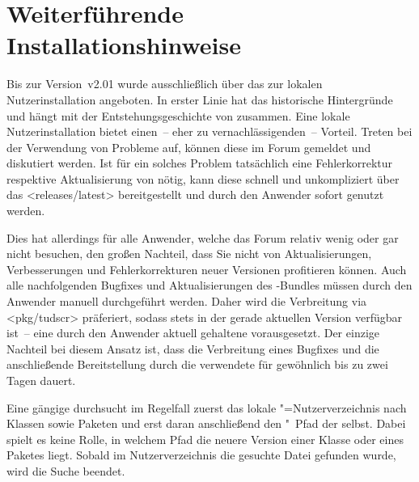\chapter{%
  Weiterführende Installationshinweise%
  \label{sec:install:ext}%
}
\noindent{}

\bigskip\noindent
Bis zur Version~v2.01 wurde \TUDScript ausschließlich über das \Forum zur 
lokalen Nutzerinstallation angeboten. In erster Linie hat das historische 
Hintergründe und hängt mit der Entstehungsgeschichte von \TUDScript zusammen. 
Eine lokale Nutzerinstallation bietet einen~-- eher zu vernachlässigenden~-- 
Vorteil. Treten bei der Verwendung von \TUDScript Probleme auf, können diese im 
Forum gemeldet und diskutiert werden. Ist für ein solches Problem tatsächlich 
eine Fehlerkorrektur respektive Aktualisierung von \TUDScript nötig, kann diese 
schnell und unkompliziert über das \GitHubRepo<releases/latest> bereitgestellt 
und durch den Anwender sofort genutzt werden.

Dies hat allerdings für alle Anwender, welche das Forum relativ wenig oder gar 
nicht besuchen, den großen Nachteil, dass Sie nicht von Aktualisierungen, 
Verbesserungen und Fehlerkorrekturen neuer Versionen profitieren können. Auch 
alle nachfolgenden Bugfixes und Aktualisierungen des \TUDScript-Bundles müssen 
durch den Anwender manuell durchgeführt werden. Daher wird die Verbreitung via 
\CTAN<pkg/tudscr> präferiert, sodass \TUDScript stets in der gerade aktuellen 
Version verfügbar ist~-- eine durch den Anwender aktuell gehaltene 
\DistributionGeneral vorausgesetzt. Der einzige Nachteil bei diesem Ansatz ist, 
dass die Verbreitung eines Bugfixes und die anschließende Bereitstellung durch 
die verwendete \DistributionGeneral für gewöhnlich bis zu zwei Tagen dauert.

Eine gängige \DistributionGeneral durchsucht im Regelfall zuerst das lokale 
"=Nutzerverzeichnis nach Klassen sowie Paketen und erst daran 
anschließend den "~Pfad der \DistributionGeneral selbst. Dabei 
spielt es keine Rolle, in welchem Pfad die neuere Version einer Klasse oder 
eines Paketes liegt. Sobald im Nutzerverzeichnis die gesuchte Datei gefunden 
wurde, wird die Suche beendet.


